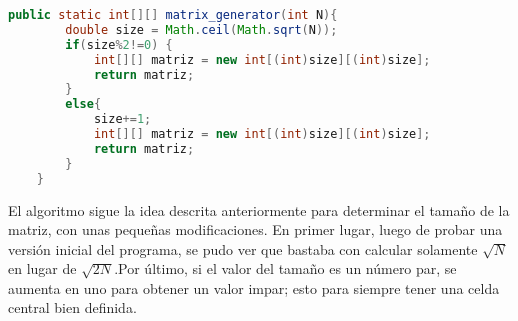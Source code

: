 \documentclass[letterpaper,11pt]{article} %
\begin{document}
\begin{lstlisting}[language=Java, caption=Algoritmo generador de matrices]
   public static int[][] matrix_generator(int N){
        double size = Math.ceil(Math.sqrt(N));
        if(size%2!=0) {
            int[][] matriz = new int[(int)size][(int)size];
            return matriz;
        }
        else{
            size+=1;
            int[][] matriz = new int[(int)size][(int)size];
            return matriz;
        }
    }
\end{lstlisting}
\newp
El algoritmo sigue la idea descrita anteriormente para determinar el tamaño de la matriz, con unas pequeñas modificaciones. En primer lugar, luego de probar una versión inicial del programa, se pudo ver que bastaba con calcular solamente $\sqrt{N}$ en lugar de $\sqrt{2N}$.Por último, si el valor del tamaño es un número par, se aumenta en uno para obtener un valor impar; esto para siempre tener una celda central bien definida.
\end{document}
